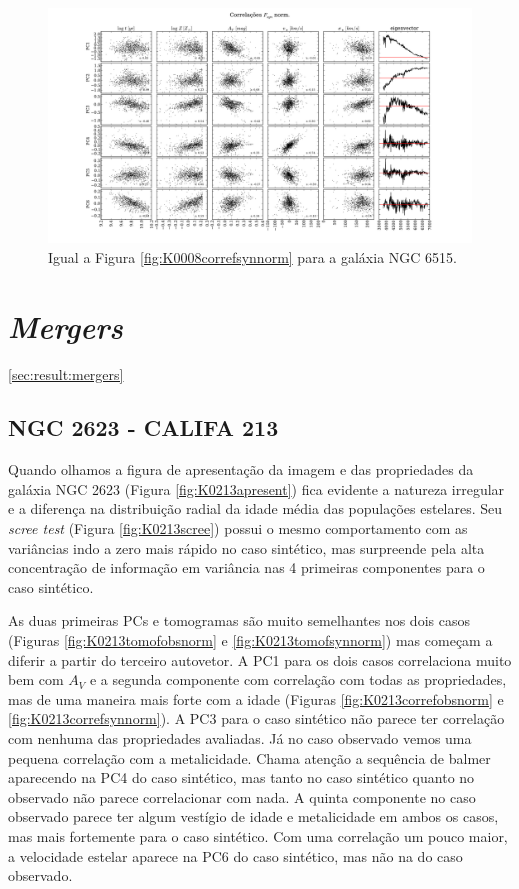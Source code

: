 \begin{figure}
    \includegraphics[width=1.3\textwidth, angle=-90]{figuras/K0864-correl-f_syn_norm-PCvsPhys.pdf}
	\caption[Correlações PCs vs. par\^ametros f\'isicos - $F_{syn}$ norm. - NGC 6515.]
	{Igual a Figura \ref{fig:K0008correfsynnorm} para a galáxia NGC 6515.}
    \label{fig:K0864correfsynnorm}
\end{figure}

\section{{\em Mergers}}
\ref{sec:result:mergers}

\subsection{NGC 2623 - CALIFA 213}

Quando olhamos a figura de apresentação da imagem e das propriedades da galáxia NGC 2623 (Figura
\ref{fig:K0213apresent}) fica evidente a natureza irregular e a diferença na distribuição radial da idade média das
populações estelares. Seu {\em scree test} (Figura \ref{fig:K0213scree}) possui o mesmo comportamento com as
variâncias indo a zero mais rápido no caso sintético, mas surpreende pela alta concentração de informação em variância
nas 4 primeiras componentes para o caso sintético.

As duas primeiras PCs e tomogramas são muito semelhantes nos dois casos (Figuras \ref{fig:K0213tomofobsnorm} e
\ref{fig:K0213tomofsynnorm}) mas começam a diferir a partir do terceiro autovetor. A PC1 para os dois casos correlaciona
muito bem com $A_V$ e a segunda componente com correlação com todas as propriedades, mas de uma maneira mais forte com a
idade (Figuras \ref{fig:K0213correfobsnorm} e \ref{fig:K0213correfsynnorm}). A PC3 para o caso sintético não parece ter
correlação com nenhuma das propriedades avaliadas. Já no caso observado vemos uma pequena correlação com a metalicidade.
Chama atenção a sequência de balmer aparecendo na PC4 do caso sintético, mas tanto no caso sintético quanto no observado
não parece correlacionar com nada. A quinta componente no caso observado parece ter algum vestígio de idade e
metalicidade em ambos os casos, mas mais fortemente para o caso sintético. Com uma correlação um pouco maior, a
velocidade estelar aparece na PC6 do caso sintético, mas não na do caso observado.

